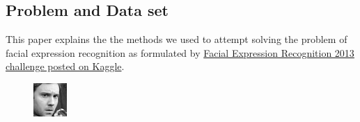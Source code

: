 \documentclass[11pt]{article}
\begin{document}
	\subsection{Problem and Data set}
	This paper explains the the methods we used to attempt solving the problem of facial expression recognition as formulated by
	\href{https://www.kaggle.com/c/challenges-in-representation-learning-facial-expression-recognition-challenge/data}{Facial Expression Recognition 2013 challenge posted on Kaggle}.
\begin{figure}[!htbp]
  \centering
  \begin{minipage}[b]{0.2\textwidth}
    \includegraphics[width=\textwidth]{face0}


\end{minipage}
\end{figure}
\end{document}
